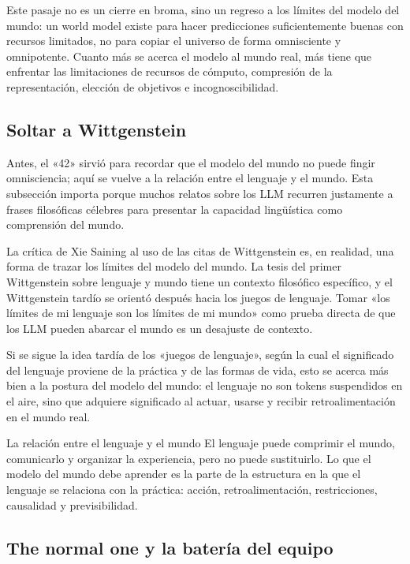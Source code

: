 \documentclass[a4paper]{article}
\begin{document}
Este pasaje no es un cierre en broma, sino un regreso a los límites del modelo del mundo: un world model existe para hacer predicciones suficientemente buenas con recursos limitados, no para copiar el universo de forma omnisciente y omnipotente. Cuanto más se acerca el modelo al mundo real, más tiene que enfrentar las limitaciones de recursos de cómputo, compresión de la representación, elección de objetivos e incognoscibilidad.

\subsection{Soltar a Wittgenstein}

Antes, el «42» sirvió para recordar que el modelo del mundo no puede fingir omnisciencia; aquí se vuelve a la relación entre el lenguaje y el mundo. Esta subsección importa porque muchos relatos sobre los LLM recurren justamente a frases filosóficas célebres para presentar la capacidad lingüística como comprensión del mundo.

La crítica de Xie Saining al uso de las citas de Wittgenstein es, en realidad, una forma de trazar los límites del modelo del mundo. La tesis del primer Wittgenstein sobre lenguaje y mundo tiene un contexto filosófico específico, y el Wittgenstein tardío se orientó después hacia los juegos de lenguaje. Tomar «los límites de mi lenguaje son los límites de mi mundo» como prueba directa de que los LLM pueden abarcar el mundo es un desajuste de contexto.

Si se sigue la idea tardía de los «juegos de lenguaje», según la cual el significado del lenguaje proviene de la práctica y de las formas de vida, esto se acerca más bien a la postura del modelo del mundo: el lenguaje no son tokens suspendidos en el aire, sino que adquiere significado al actuar, usarse y recibir retroalimentación en el mundo real.

\begin{importantbox}{La relación entre el lenguaje y el mundo}
El lenguaje puede comprimir el mundo, comunicarlo y organizar la experiencia, pero no puede sustituirlo. Lo que el modelo del mundo debe aprender es la parte de la estructura en la que el lenguaje se relaciona con la práctica: acción, retroalimentación, restricciones, causalidad y previsibilidad.
\end{importantbox}

\subsection{The normal one y la batería del equipo}
\end{document}
